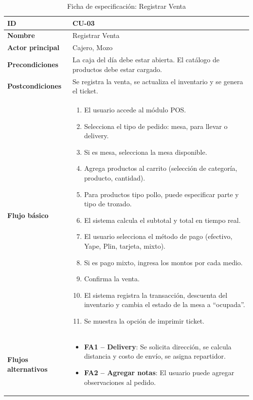 \documentclass[12pt, a4paper]{article}
\begin{document}
\begin{table}[H]
\centering
\caption{Ficha de especificación: Registrar Venta}
\begin{tabularx}{\textwidth}{|l|X|}
    \hline
    \textbf{ID} & CU-03 \\ \hline
    \textbf{Nombre} & Registrar Venta \\ \hline
    \textbf{Actor principal} & Cajero, Mozo \\ \hline
    \textbf{Precondiciones} & La caja del día debe estar abierta. El catálogo de productos debe estar cargado. \\ \hline
    \textbf{Postcondiciones} & Se registra la venta, se actualiza el inventario y se genera el ticket. \\ \hline
    \textbf{Flujo básico} &
    \begin{enumerate}[nosep, leftmargin=*]
        \item El usuario accede al módulo POS.
        \item Selecciona el tipo de pedido: mesa, para llevar o delivery.
        \item Si es mesa, selecciona la mesa disponible.
        \item Agrega productos al carrito (selección de categoría, producto, cantidad).
        \item Para productos tipo pollo, puede especificar parte y tipo de trozado.
        \item El sistema calcula el subtotal y total en tiempo real.
        \item El usuario selecciona el método de pago (efectivo, Yape, Plin, tarjeta, mixto).
        \item Si es pago mixto, ingresa los montos por cada medio.
        \item Confirma la venta.
        \item El sistema registra la transacción, descuenta del inventario y cambia el estado de la mesa a ``ocupada''.
        \item Se muestra la opción de imprimir ticket.
    \end{enumerate} \\ \hline
    \textbf{Flujos alternativos} &
    \begin{itemize}[nosep, leftmargin=*]
        \item \textbf{FA1 -- Delivery}: Se solicita dirección, se calcula distancia y costo de envío, se asigna repartidor.
        \item \textbf{FA2 -- Agregar notas}: El usuario puede agregar observaciones al pedido.

\end{itemize}
\end{tabularx}
\end{table}
\end{document}
